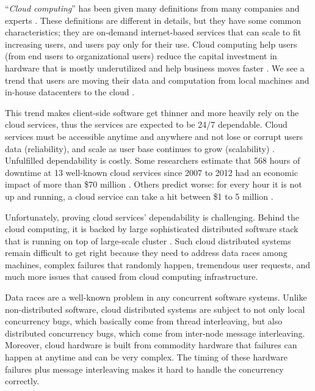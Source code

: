 ``\textit{Cloud computing}'' has been given many definitions from many companies
and experts \cite{TwentyoneCloudDef, IBMCloudDef, PCMagCloudDef,
Foster+08-CloudAndGrid}. These definitions are different in details, but they
have some common characteristics; they are on-demand internet-based services
that can scale to fit increasing users, and users pay only for their use.
%
Cloud computing help users (from end users to organizational users) reduce the
capital investment in hardware that is mostly underutilized
\cite{Hayes+08-CloudComputing} and help business moves faster
\cite{Marston+11-CloudBusiness}. We see a trend that users are moving their data
and computation from local machines and in-house datacenters to the cloud
\cite{AdobeCloudStat, AWSCustomer, GmailStat, GoogleDriveStat, DropboxStat,
FacebookStat} .

This trend makes client-side software get thinner and more heavily rely on the
cloud services, thus the services are expected to be 24/7 dependable. Cloud
services must be accessible anytime and anywhere and not lose or corrupt users
data (reliability), and scale as user base continues to grow (scalability)
\cite{Buyya+09-Cloud5thUtil}.
%
Unfulfilled dependability is costly. Some researchers estimate that 568 hours of
downtime at 13 well-known cloud services since 2007 to 2012 had an economic
impact of more than \$70 million \cite{Essers12-70Million}. Others predict
worse: for every hour it is not up and running, a cloud service can take a hit
between \$1 to 5 million \cite{Linthicum13-InfoworldCostOutages}.

Unfortunately, proving cloud services' dependability is challenging. Behind the
cloud computing, it is backed by large sophisticated distributed software stack
\cite{Burrows06-Chubby, Chang+06-BigTable, Chapin+95-Hive, Corbett+12-Spanner,
DeanGhemawat04-MapReduce, DeCandia+07-Dynamo, Ghemawat+03-GoogleFS,
Hunt+10-ZooKeeperPaper, Lakshman+09-Cassandra, Melnik+10-DremelInteractive,
Zaharia+12-RDD} that is running on top of large-scale cluster .
Such cloud distributed systems remain difficult to get right because they need
to address data races among machines, complex failures that randomly happen,
tremendous user requests, and much more issues that caused from cloud computing
infrastructure.

Data races are a well-known problem in any concurrent software systems. Unlike
non-distributed software, cloud distributed systems are subject to not only
local concurrency bugs, which basically come from thread interleaving, but also
distributed concurrency bugs, which come from inter-node message interleaving. 
Moreover, cloud hardware is built from commodity hardware that failures can
happen at anytime and can be very complex. The timing of these hardware failures
plus message interleaving makes it hard to handle the concurrency correctly.


